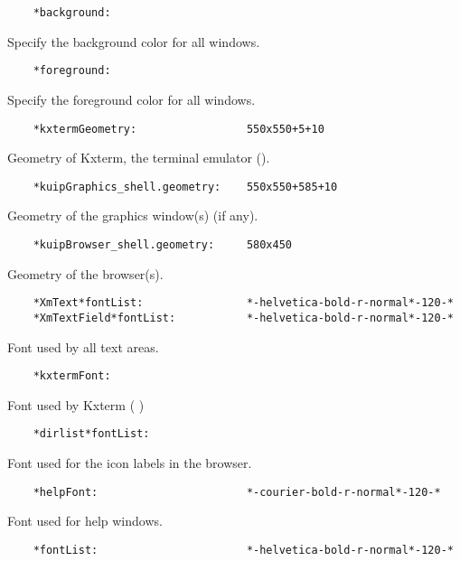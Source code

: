 \begin{verbatim}
    *background:
\end{verbatim}

   Specify the background color for all windows.

\begin{verbatim}
    *foreground:
\end{verbatim}

   Specify the foreground color for all windows.

\begin{verbatim}
    *kxtermGeometry:                 550x550+5+10
\end{verbatim}

   Geometry of Kxterm, the \KUIP{} terminal emulator (\EW).

\begin{verbatim}
    *kuipGraphics_shell.geometry:    550x550+585+10
\end{verbatim}

   Geometry of the graphics window(s) (if any).

\begin{verbatim}
    *kuipBrowser_shell.geometry:     580x450
\end{verbatim}

   Geometry of the browser(s).

\begin{verbatim}
    *XmText*fontList:                *-helvetica-bold-r-normal*-120-*
    *XmTextField*fontList:           *-helvetica-bold-r-normal*-120-*
\end{verbatim}

   Font used by all text areas.

\begin{verbatim}
    *kxtermFont:
\end{verbatim}

   Font used by Kxterm (\PAWPP{} \EW)

\begin{verbatim}
    *dirlist*fontList:
\end{verbatim}

   Font used for the icon labels in the browser.

\begin{verbatim}
    *helpFont:                       *-courier-bold-r-normal*-120-*
\end{verbatim}

   Font used for help windows.

\begin{verbatim}
    *fontList:                       *-helvetica-bold-r-normal*-120-*
\end{verbatim}

